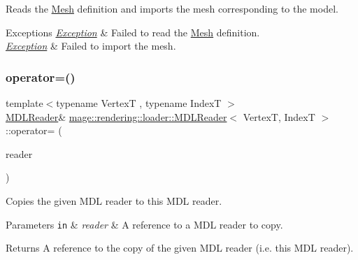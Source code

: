 Reads the \hyperlink{classmage_1_1rendering_1_1_mesh}{Mesh} definition and imports the mesh corresponding to the model.


\begin{DoxyExceptions}{Exceptions}
{\em \hyperlink{classmage_1_1_exception}{Exception}} & Failed to read the \hyperlink{classmage_1_1rendering_1_1_mesh}{Mesh} definition. \\
\hline
{\em \hyperlink{classmage_1_1_exception}{Exception}} & Failed to import the mesh. \\
\hline
\end{DoxyExceptions}
\hypertarget{classmage_1_1rendering_1_1loader_1_1_m_d_l_reader_a76e89824650cdf1d737048ac06862166}{}\label{classmage_1_1rendering_1_1loader_1_1_m_d_l_reader_a76e89824650cdf1d737048ac06862166} 
\subsubsection{\texorpdfstring{operator=()}{operator=()}\hspace{0.1cm}{\footnotesize\ttfamily [1/2]}}
{\footnotesize\ttfamily template$<$typename VertexT , typename IndexT $>$ \\
\hyperlink{classmage_1_1rendering_1_1loader_1_1_m_d_l_reader}{M\+D\+L\+Reader}\& \hyperlink{classmage_1_1rendering_1_1loader_1_1_m_d_l_reader}{mage\+::rendering\+::loader\+::\+M\+D\+L\+Reader}$<$ VertexT, IndexT $>$\+::operator= (\begin{DoxyParamCaption}\item[{const \hyperlink{classmage_1_1rendering_1_1loader_1_1_m_d_l_reader}{M\+D\+L\+Reader}$<$ VertexT, IndexT $>$ \&}]{reader }\end{DoxyParamCaption})\hspace{0.3cm}{\ttfamily [delete]}}

Copies the given M\+DL reader to this M\+DL reader.


\begin{DoxyParams}[1]{Parameters}
\mbox{\tt in}  & {\em reader} & A reference to a M\+DL reader to copy. \\
\hline
\end{DoxyParams}
\begin{DoxyReturn}{Returns}
A reference to the copy of the given M\+DL reader (i.\+e. this M\+DL reader). 
\end{DoxyReturn}
\hypertarget{classmage_1_1rendering_1_1loader_1_1_m_d_l_reader_a2afa24fc79ecdcf15f0cbf09f7a78e52}{}\label{classmage_1_1rendering_1_1loader_1_1_m_d_l_reader_a2afa24fc79ecdcf15f0cbf09f7a78e52} 
